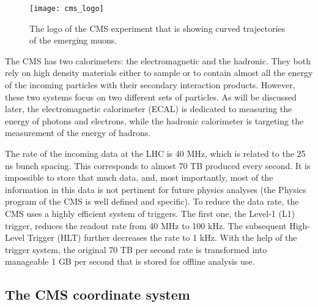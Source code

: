 \begin{normalsize}
\begin{figure}[H]
  \centering
  \texttt{[image: cms\_logo]}
  \caption{The logo of the CMS experiment that is showing curved trajectories of the emerging muons.}
  \label{cms_logo}
\end{figure}


The CMS has two calorimeters: the electromagnetic and the hadronic. They both rely on high density materials either to sample or to contain almost all the energy of the incoming particles with their secondary interaction products. However, these two systems focus on two different sets of particles. As will be discussed later, the electromagnetic calorimeter (ECAL) is dedicated to measuring the energy of photons and electrons, while the hadronic calorimeter is targeting the measurement of the energy of hadrons.


The rate of the incoming data at the LHC is 40 MHz, which is related to the 25 ns bunch spacing. This corresponds to almost 70 TB produced every second. It is impossible to store that much data, and, most importantly, most of the information in this data is not pertinent for future physics analyses (the Physics program of the CMS is well defined and specific). To reduce the data rate, the CMS uses a highly efficient system of triggers. The first one, the Level-1 (L1) trigger, reduces the readout rate from 40 MHz to 100 kHz. The subsequent High-Level Trigger (HLT) further decreases the rate to 1 kHz. With the help of the trigger system, the original 70 TB per second rate is transformed into manageable 1 GB per second that is stored for offline analysis use. 




\subsection{The CMS coordinate system}


\end{normalsize}
